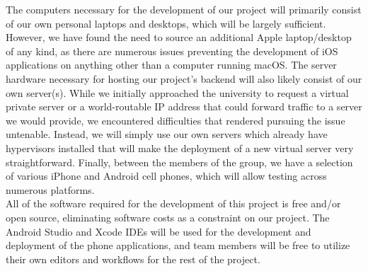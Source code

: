 \documentclass[11pt]{article}
\begin{document}
The computers necessary for the development of our project will primarily consist of our own personal laptops and desktops, which will be largely sufficient. However, we have found the need to source an additional Apple laptop/desktop of any kind, as there are numerous issues preventing the development of iOS applications on anything other than a computer running macOS. The server hardware necessary for hosting our project’s backend will also likely consist of our own server(s). While we initially approached the university to request a virtual private server or a world-routable IP address that could forward traffic to a server we would provide, we encountered difficulties that rendered pursuing the issue untenable. Instead, we will simply use our own servers which already have hypervisors installed that will make the deployment of a new virtual server very straightforward. Finally, between the members of the group, we have a selection of various iPhone and Android cell phones, which will allow testing across numerous platforms.  \\

All of the software required for the development of this project is free and/or open source, eliminating software costs as a constraint on our project. The Android Studio and Xcode IDEs will be used for the development and deployment of the phone applications, and team members will be free to utilize their own editors and workflows for the rest of the project.
\end{document}
